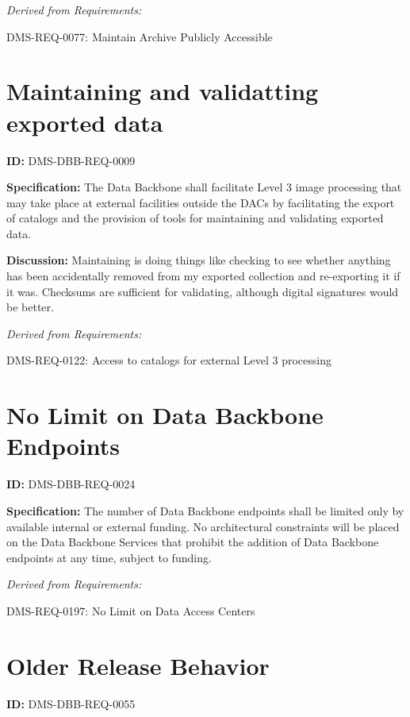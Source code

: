 \documentclass[SE,toc,lsstdraft]{lsstdoc}
\begin{document}
\emph{Derived from Requirements:}

DMS-REQ-0077:
Maintain Archive Publicly Accessible \newline

\section{Maintaining and validatting exported data}

\label{DMS-DBB-REQ-0009}
\textbf{ID:} DMS-DBB-REQ-0009

\textbf{Specification:}
The Data Backbone shall facilitate Level 3 image processing that may take place at external facilities outside the DACs by facilitating the export of catalogs and the provision of tools for maintaining and validating exported data.

\textbf{Discussion:}
Maintaining is doing things like checking to see whether anything has been accidentally removed from my exported collection and re-exporting it if it was.  Checksums are sufficient for validating, although digital signatures would be better.

\emph{Derived from Requirements:}

DMS-REQ-0122:
Access to catalogs for external Level 3 processing \newline

\section{No Limit on Data Backbone Endpoints}

\label{DMS-DBB-REQ-0024}
\textbf{ID:} DMS-DBB-REQ-0024

\textbf{Specification:}
The number of Data Backbone endpoints shall be limited only by available internal or external funding. No architectural constraints will be placed on the Data Backbone Services that prohibit the addition of Data Backbone endpoints at any time, subject to funding.

\emph{Derived from Requirements:}

DMS-REQ-0197:
No Limit on Data Access Centers \newline

\section{Older Release Behavior}

\label{DMS-DBB-REQ-0055}
\textbf{ID:} DMS-DBB-REQ-0055
\end{document}
